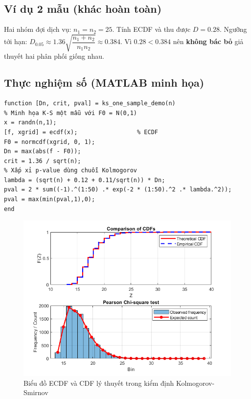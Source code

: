\subsection{Ví dụ 2 mẫu (khác hoàn toàn)}
Hai nhóm đợi dịch vụ: $n_1=n_2=25$. Tính ECDF và thu được $D=0.28$. Ngưỡng tới hạn: $D_{0.05}\approx1.36\sqrt{\dfrac{n_1+n_2}{n_1n_2}}\approx0.384$. Vì $0.28<0.384$ nên \textbf{không bác bỏ} giả thuyết hai phân phối giống nhau.

\subsection{Thực nghiệm số (MATLAB minh họa)}
\begin{matlab}
\begin{lstlisting}
function [Dn, crit, pval] = ks_one_sample_demo(n)
% Minh họa K-S một mẫu với F0 = N(0,1)
x = randn(n,1);
[f, xgrid] = ecdf(x);                 % ECDF
F0 = normcdf(xgrid, 0, 1);
Dn = max(abs(f - F0));
crit = 1.36 / sqrt(n);
% Xấp xỉ p-value dùng chuỗi Kolmogorov
lambda = (sqrt(n) + 0.12 + 0.11/sqrt(n)) * Dn;
pval = 2 * sum((-1).^(1:50) .* exp(-2 * (1:50).^2 .* lambda.^2));
pval = max(min(pval,1),0);
end
\end{lstlisting}
\end{matlab}

\begin{figure}[h!]
    \centering
    \includegraphics[width=0.8\linewidth]{../../assets/images/KS_fig_Singletons.png}
    \caption{Biểu đồ ECDF và CDF lý thuyết trong kiểm định Kolmogorov-Smirnov}
\end{figure}










